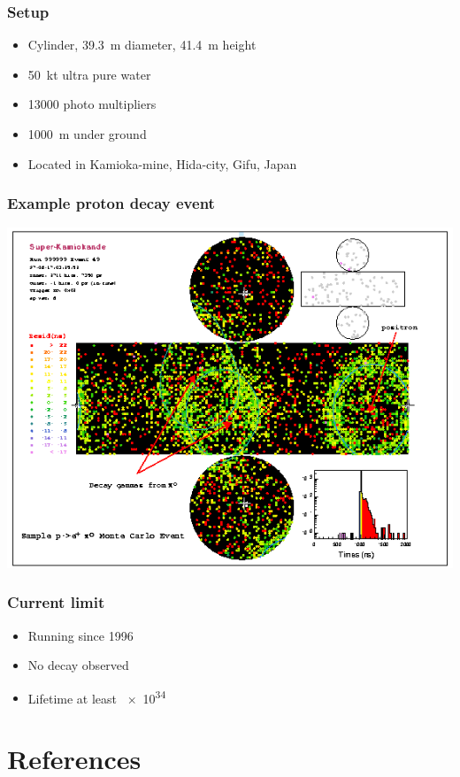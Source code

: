 \documentclass[english, fleqn]{beamer}
\begin{document}
\begin{frame}
    \frametitle{Setup}

    \begin{itemize}
        \item Cylinder, \SI{39.3}{\meter} diameter, \SI{41.4}{\meter} height
        \item \SI{50}{\kilo\tonne} ultra pure water
        \item \num{13000} photo multipliers
        \item \SI{1000}{\meter} under ground
        \item Located in Kamioka-mine, Hida-city, Gifu, Japan
    \end{itemize}

    \parencite{super-k/overview}
\end{frame}

\begin{frame}
    \frametitle{}

\end{frame}

\begin{frame}
    \frametitle{Example proton decay event}

    \centering
    \includegraphics[width=0.8\linewidth]{Figures/epi0_nice_event.png}
    \parencite{boston_university/proton_decay}
\end{frame}


\begin{frame}
    \frametitle{Current limit}

    \begin{itemize}
        \item Running since 1996
        \item No decay observed
        \item Lifetime at least \SI{e34}{\year}
    \end{itemize}

    \parencite{super-k/proton_decay}
\end{frame}

\begin{frame}
    \titlepage
\end{frame}


\nocite{tikz-feynman}

\section*{References}

\begin{frame}[allowframebreaks]

    \printbibliography
\end{frame}
\end{document}

